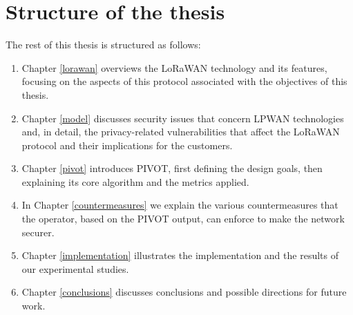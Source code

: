 \section{Structure of the thesis}
The rest of this thesis is structured as follows:
\begin{enumerate}
    \item Chapter \ref{lorawan} overviews the LoRaWAN technology and its features, focusing on the aspects of this protocol associated with the objectives of this thesis. 
    \item Chapter \ref{model} discusses security issues that concern LPWAN technologies and, in detail, the privacy-related vulnerabilities that affect the LoRaWAN protocol and their implications for the customers.
    \item Chapter \ref{pivot} introduces PIVOT, first defining the design goals, then explaining its core algorithm and the metrics applied. 
    \item In Chapter \ref{countermeasures} we explain the various countermeasures that the operator, based on the PIVOT output, can enforce to make the network securer.
    \item Chapter \ref{implementation} illustrates the implementation and the results of our experimental studies.
    \item Chapter \ref{conclusions} discusses conclusions and possible directions for future work.
\end{enumerate}